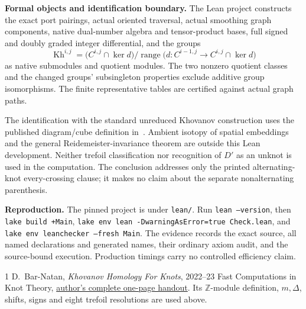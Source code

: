 \documentclass[10pt]{article}
\newcommand{\Z}{\mathbb Z}
\newcommand{\Kh}{\operatorname{Kh}}
\begin{document}
\textbf{Formal objects and identification boundary.}
The Lean project constructs the exact port pairings, actual oriented traversal,
actual smoothing graph components, native dual-number algebra and tensor-product
bases, full signed and doubly graded integer differential, and the groups
\[
 \Kh^{i,j}=\bigl(C^{i,j}\cap\ker d\bigr)/
       \operatorname{range}\bigl(d:C^{i-1,j}\longrightarrow C^{i,j}\cap\ker d\bigr)
\]
as native submodules and quotient modules. The two nonzero quotient classes and
the changed groups' subsingleton properties exclude additive group isomorphisms.
The finite representative tables are certified against actual graph paths.

The identification with the standard unreduced Khovanov construction uses the
published diagram/cube definition in~\cite{BN}. Ambient isotopy of spatial
embeddings and the general Reidemeister-invariance theorem are outside this
Lean development. Neither trefoil classification nor recognition of $D'$ as an
unknot is used in the computation. The conclusion addresses only the printed
alternating-knot every-crossing clause; it makes no claim about the separate
nonalternating parenthesis.

\textbf{Reproduction.} The pinned project is under \texttt{lean/}. Run
\texttt{lean --version}, then \texttt{lake build +Main},
\texttt{lake env lean -DwarningAsError=true Check.lean}, and
\texttt{lake env leanchecker --fresh Main}. The evidence records the exact source,
all named declarations and generated names, their ordinary axiom audit, and the
source-bound execution. Production timings carry no controlled efficiency claim.

\begin{thebibliography}{1}\small
{} D.~Bar-Natan, \emph{Khovanov Homology For Knots},
2022--23 Fast Computations in Knot Theory,
\href{https://katlas.math.toronto.edu/drorbn/AcademicPensieve/Classes/23-FastComputations/KH4Knots/KH4Knots.pdf}{author's complete one-page handout}.
Its $\Z$-module definition, $m,\Delta$, shifts, signs and eight trefoil resolutions are used above.
\end{thebibliography}
\end{document}
